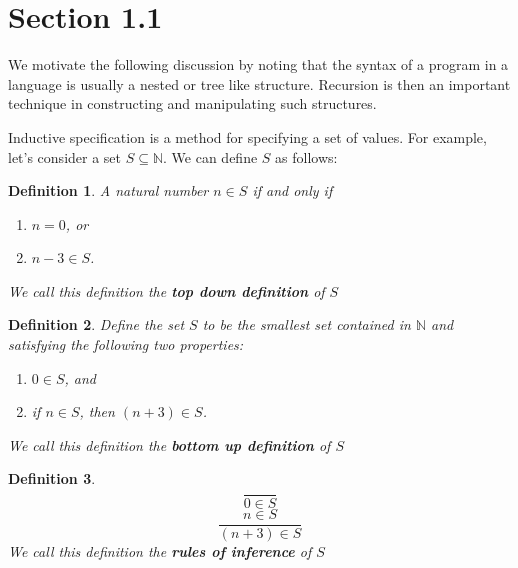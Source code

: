 \documentclass{article}
\newtheorem{mydef}{Definition}
\begin{document}
\section*{Section 1.1}

We motivate the following discussion by noting that the syntax of a program 
in a language is usually a nested or tree like structure. Recursion is then 
an important technique in constructing and manipulating such structures.  

Inductive specification is a method for specifying a set of values. For example,
let's consider a set $ S \subseteq \mathbb{N} $. We can define $S$ as follows: 

\begin{mydef} \textit{A natural number} $n \in S$ \textit{if and only if}  
\begin{enumerate} 
  \item $n = 0$, or 
  \item $ n - 3 \in S $. 
\end{enumerate}
\textit{We call this definition the \textbf{top down definition} of $S$}
\end{mydef} 


\begin{mydef} \textit{Define the set $S$ to be the smallest set contained in $\mathbb{N}$ and satisfying the following two properties:} 
\begin{enumerate}
  \item $0 \in S$, and 
  \item if $n \in S$, then $(n + 3) \in S$. 
\end{enumerate}
\textit{We call this definition the \textbf{bottom up definition} of $S$}
\end{mydef}


\begin{mydef} $$ \frac{}{0 \in S}$$ $$ \frac{n \in S}{(n + 3) \in S} $$ 
\textit{We call this definition the \textbf{rules of inference} of $S$}
\end{mydef}
\end{document}
